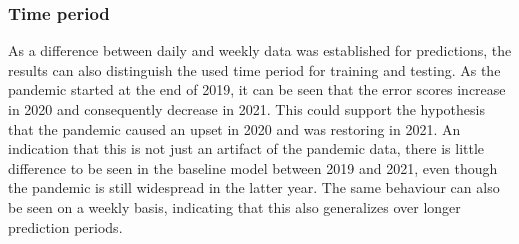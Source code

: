 \subsubsection{Time period}
As a difference between daily and weekly data was established for predictions, the results can also distinguish the used time period for training and testing.
As the pandemic started at the end of 2019, it can be seen that the error scores increase in 2020 and consequently decrease in 2021. This could support the hypothesis that the pandemic caused an upset in 2020 and was restoring in 2021. An indication that this is not just an artifact of the pandemic data, there is little difference to be seen in the baseline model between 2019 and 2021, even though the pandemic is still widespread in the latter year. The same behaviour can also be seen on a weekly basis, indicating that this also generalizes over longer prediction periods.


